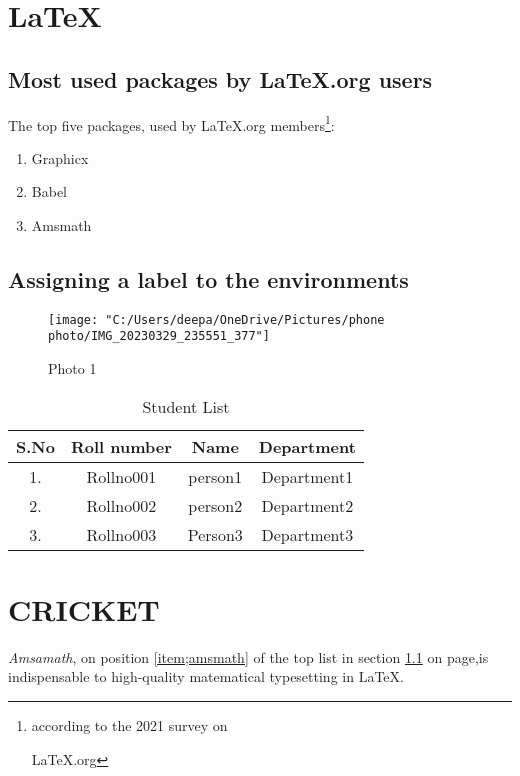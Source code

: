 \documentclass[a4paper]{book}
\begin{document}
	\chapter{\LaTeX}
	\section {Most used packages by LaTeX.org users}\label{sec:packages}
	The top five packages, used by LaTeX.org members\footnote{according to the 2021
		survey on
		
		LaTeX.org\label{fn:project}}:
	\begin{enumerate}
		\item Graphicx\label{item:graphicx}
		\item Babel
		\item Amsmath\label{item;amsmath}
	\end{enumerate}
	\section{Assigning a label to the environments}\label{sec:envir}
	\blindtext[1]
	\begin{figure}[ht]
		\centering
		\texttt{[image: "C:/Users/deepa/OneDrive/Pictures/phone photo/IMG\_20230329\_235551\_377"]}
		\caption{Photo 1}\label{fig:Ai}
	\end{figure}
	\blindtext[1]
	\begin{table}[h!]
		\centering
		\begin{tabular}{|c|c|c|c|}
			\hline
			S.No &Roll number &Name  &Department \\
			\hline
			1. &Rollno001 &person1&Department1 \\
			2. &Rollno002 &person2 &Department2\\
			3. &Rollno003&Person3 &Department3\\
			\hline
		\end{tabular}
		\caption{Student List}\label{tab:student list}
	\end{table}
	\chapter{CRICKET}
	\emph{Amsamath}, on position \ref{item;amsmath} of the top list in section
	\ref{sec:packages} on
	page\pageref{sec:packages},is indispensable to high-quality matematical typesetting in
	\LaTeX. \\
	\blindtext[4]
\end{document}
